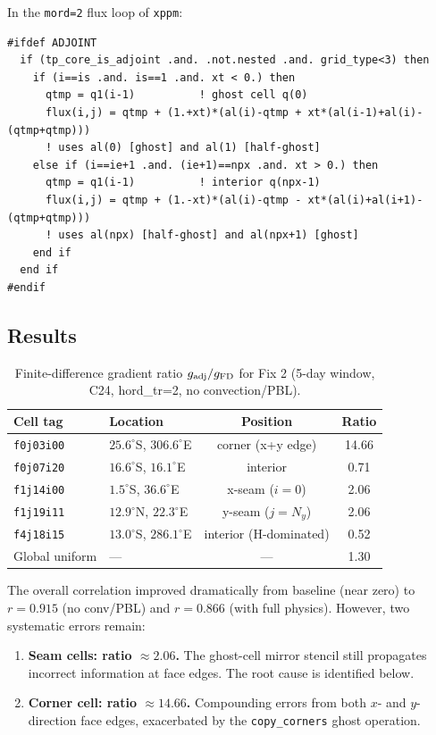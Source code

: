 \documentclass[11pt]{article}
\begin{document}
In the \texttt{mord=2} flux loop of \texttt{xppm}:
\begin{lstlisting}
#ifdef ADJOINT
  if (tp_core_is_adjoint .and. .not.nested .and. grid_type<3) then
    if (i==is .and. is==1 .and. xt < 0.) then
      qtmp = q1(i-1)          ! ghost cell q(0)
      flux(i,j) = qtmp + (1.+xt)*(al(i)-qtmp + xt*(al(i-1)+al(i)-(qtmp+qtmp)))
      ! uses al(0) [ghost] and al(1) [half-ghost]
    else if (i==ie+1 .and. (ie+1)==npx .and. xt > 0.) then
      qtmp = q1(i-1)          ! interior q(npx-1)
      flux(i,j) = qtmp + (1.-xt)*(al(i)-qtmp - xt*(al(i)+al(i+1)-(qtmp+qtmp)))
      ! uses al(npx) [half-ghost] and al(npx+1) [ghost]
    end if
  end if
#endif
\end{lstlisting}

\subsection{Results}

\begin{table}[h]
\centering
\caption{Finite-difference gradient ratio $g_{\rm adj}/g_{\rm FD}$ for Fix 2
  (5-day window, C24, hord\_tr=2, no convection/PBL).}
\begin{tabular}{llcc}
\toprule
Cell tag & Location & Position & Ratio \\
\midrule
\texttt{f0j03i00} & $25.6^\circ$S, $306.6^\circ$E & corner (x+y edge) & 14.66 \\
\texttt{f0j07i20} & $16.6^\circ$S, $16.1^\circ$E  & interior          & 0.71  \\
\texttt{f1j14i00} & $1.5^\circ$S,  $36.6^\circ$E  & x-seam ($i=0$)   & 2.06  \\
\texttt{f1j19i11} & $12.9^\circ$N, $22.3^\circ$E  & y-seam ($j=N_y$) & 2.06  \\
\texttt{f4j18i15} & $13.0^\circ$S, $286.1^\circ$E & interior (H-dominated)& 0.52 \\
Global uniform    & ---                            & ---               & 1.30  \\
\bottomrule
\end{tabular}
\label{tab:fix2_results}
\end{table}

The overall correlation improved dramatically from baseline (near zero) to
$r = 0.915$ (no conv/PBL) and $r = 0.866$ (with full physics). However, two
systematic errors remain:

\begin{enumerate}
  \item \textbf{Seam cells: ratio $\approx 2.06$.} The ghost-cell mirror
    stencil still propagates incorrect information at face edges. The root
    cause is identified below.
  \item \textbf{Corner cell: ratio $\approx 14.66$.} Compounding errors from
    both $x$- and $y$-direction face edges, exacerbated by the
    \texttt{copy\_corners} ghost operation.
\end{enumerate}
\end{document}
